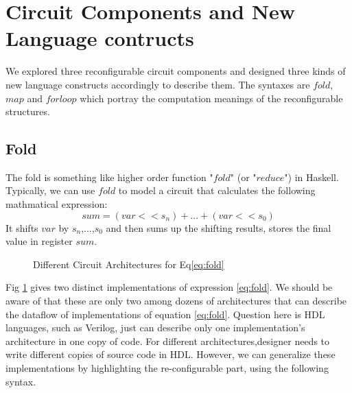 \section{Circuit Components and  New Language contructs}\label{sec:syntax}
We explored three reconfigurable circuit components and designed three kinds of new language constructs accordingly to describe them. The syntaxes are $fold$, $map$ and $forloop$ which portray the computation meanings of the reconfigurable structures.

\subsection{Fold}
The fold is something like higher order function\cite{highorderfunction} "$fold$" (or "$reduce$") in Haskell. Typically, we can use $fold$ to model a circuit that calculates the following mathmatical expression:
\begin{equation} \label{eq:fold} sum = (var << s_n) + ... + (var << s_0) \end{equation}
It shifts $var$ by $s_n$,...,$s_0$ and then sums up the shifting results, stores the final value in register $sum$.
\begin{figure}[h]
\centering
{}
\caption{Different Circuit Architectures for Eq\eqref{eq:fold}}
\label{fig-fold}
\end{figure}
Fig \ref{fig-fold} gives two distinct implementations of expression \eqref{eq:fold}. We should be aware of that these are only two among dozens of architectures that can describe the dataflow of implementations of equation \eqref{eq:fold}. Question here is HDL languages, such as Verilog, just can describe only one implementation's architecture in one copy of code. For different architectures,designer needs to write different copies of source code in HDL. However, we can generalize these implementations by highlighting the re-configurable part, using the following syntax.

